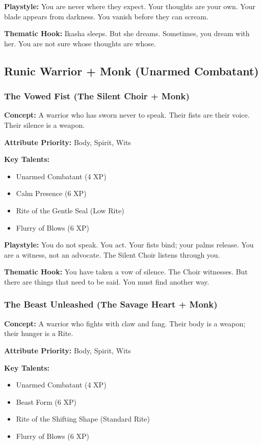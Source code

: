 \textbf{Playstyle:} You are never where they expect. Your thoughts are your own. Your blade appears from darkness. You vanish before they can scream.

\textbf{Thematic Hook:} Ikasha sleeps. But she dreams. Sometimes, you dream with her. You are not sure whose thoughts are whose.

\subsection{Runic Warrior + Monk (Unarmed Combatant)}

\subsubsection{The Vowed Fist (The Silent Choir + Monk)}

\textbf{Concept:} A warrior who has sworn never to speak. Their fists are their voice. Their silence is a weapon.

\textbf{Attribute Priority:} Body, Spirit, Wits

\textbf{Key Talents:}
\begin{itemize}
\item Unarmed Combatant (4 XP)
\item Calm Presence (6 XP)
\item Rite of the Gentle Seal (Low Rite)
\item Flurry of Blows (6 XP)
\end{itemize}

\textbf{Playstyle:} You do not speak. You act. Your fists bind; your palms release. You are a witness, not an advocate. The Silent Choir listens through you.

\textbf{Thematic Hook:} You have taken a vow of silence. The Choir witnesses. But there are things that need to be said. You must find another way.

\subsubsection{The Beast Unleashed (The Savage Heart + Monk)}

\textbf{Concept:} A warrior who fights with claw and fang. Their body is a weapon; their hunger is a Rite.

\textbf{Attribute Priority:} Body, Spirit, Wits

\textbf{Key Talents:}
\begin{itemize}
\item Unarmed Combatant (4 XP)
\item Beast Form (6 XP)
\item Rite of the Shifting Shape (Standard Rite)
\item Flurry of Blows (6 XP)
\end{itemize}

